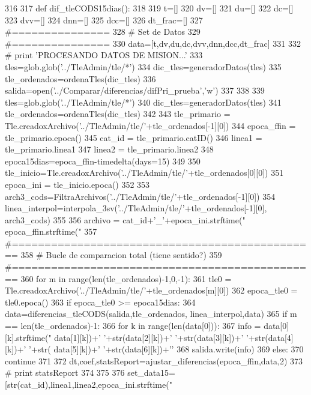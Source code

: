 \begin{DoxyCode}
316 
317 def dif_tleCODS15dias():
318     
319     t=[]
320     dv=[]
321     du=[]
322     dc=[]
323     dvv=[]
324     dnn=[]
325     dcc=[]
326     dt_frac=[]
327     #===============
328     # Set de Datos
329     #===============
330     data=[t,dv,du,dc,dvv,dnn,dcc,dt_frac]   
331     
332 #    print 'PROCESANDO DATOS DE MISION...'
333     tles=glob.glob('../TleAdmin/tle/*')
334     dic_tles=generadorDatos(tles)
335     tle_ordenados=ordenaTles(dic_tles)
336     salida=open('../Comparar/diferencias/difPri_prueba','w')
337      
338     
339     tles=glob.glob('../TleAdmin/tle/*')
340     dic_tles=generadorDatos(tles)
341     tle_ordenados=ordenaTles(dic_tles)
342     
343     tle_primario = Tle.creadoxArchivo('../TleAdmin/tle/'+tle_ordenados[-1][0])
344     epoca_ffin  = tle_primario.epoca()
345     cat_id = tle_primario.catID()
346     linea1 = tle_primario.linea1
347     linea2 = tle_primario.linea2
348     epoca15dias=epoca_ffin-timedelta(days=15)
349     
350     tle_inicio=Tle.creadoxArchivo('../TleAdmin/tle/'+tle_ordenados[0][0])
351     epoca_ini  = tle_inicio.epoca()
352     
353     arch3_cods=FiltraArchivos('../TleAdmin/tle/'+tle_ordenados[-1][0])
354     linea_interpol=interpola_3sv('../TleAdmin/tle/'+tle_ordenados[-1][0], 
      arch3_cods)
355     
356     archivo = cat_id+'_'+epoca_ini.strftime("%
      epoca_ffin.strftime("%
357     #===============================================
358     # Bucle de comparacion total  (tiene sentido?)
359     #===============================================
360     for m in range(len(tle_ordenados)-1,0,-1):
361         tle0 = Tle.creadoxArchivo('../TleAdmin/tle/'+tle_ordenados[m][0])
362         epoca_tle0 = tle0.epoca()
363         if epoca_tle0 >= epoca15dias:          
364             data=diferencias_tleCODS(salida,tle_ordenados, linea_interpol,data)
365             if m == len(tle_ordenados)-1:
366                 for k in range(len(data[0])):
367                     info = data[0][k].strftime("%
      data[1][k])+' '+str(data[2][k])+' '+str(data[3][k])+' '+str(data[4][k])+' '+str(
      data[5][k])+' '+str(data[6][k])+'\n'
368                     salida.write(info)
369         else:
370             continue
371     
372     dt,coef,statsReport=ajustar_diferencias(epoca_ffin,data,2)    
373 #    print statsReport
374     
375     
376     set_data15=[str(cat_id),linea1,linea2,epoca_ini.strftime("%

\end{DoxyCode}
